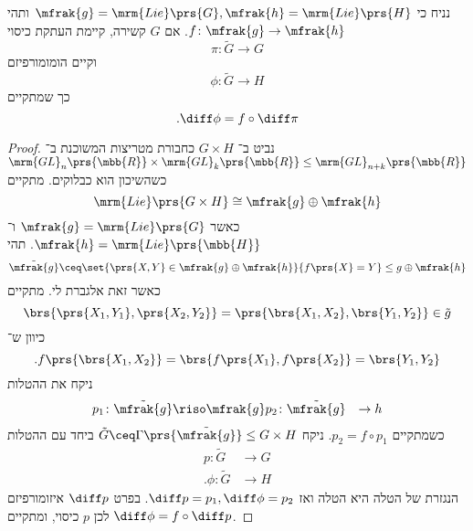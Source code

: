 \documentclass[10pt, twoside]{book}
\newcommand{\Lie}{\mrm{Lie}}
\begin{document}
\begin{theorem}
נניח כי
$\mfrak{g} = \Lie\prs{G}, \mfrak{h} = \Lie\prs{H}$
ותהי
$f \colon \mfrak{g} \to \mfrak{h}$.
אם
$G$
קשירה, קיימת העתקת כיסוי
\[\pi \colon \tilde{G} \to G\]
וקיים הומומורפיזם
\[\phi \colon \tilde{G} \to H\]
כך שמתקיים
\[\text{.} \diff \phi = f \circ \diff \pi\]
\end{theorem}

\begin{proof}
נביט ב־%
$G \times H$
כחבורת מטריצות המשוכנת ב־%
$\mrm{GL}_n\prs{\mbb{R}} \times \mrm{GL}_k\prs{\mbb{R}} \leq \mrm{GL}_{n+k}\prs{\mbb{R}}$
כשהשיכון הוא כבלוקים.
מתקיים
\[\Lie\prs{G \times H} \cong \mfrak{g} \oplus \mfrak{h}\]
כאשר
$\mfrak{g} = \Lie\prs{G}$
ו־%
$\mfrak{h} = \Lie\prs{\mbb{H}}$.
תהי
\[\tilde{\mfrak{g}} \ceq \set{\prs{X,Y} \in \mfrak{g} \oplus \mfrak{h}}{f\prs{X} = Y} \leq g \oplus \mfrak{h}\]
כאשר זאת אלגברת לי. מתקיים
\[\brs{\prs{X_1, Y_1}, \prs{X_2, Y_2}} = \prs{\brs{X_1, X_2}, \brs{Y_1, Y_2}} \in \tilde{g}\]
כיוון ש־%
\[\text{.} f\prs{\brs{X_1, X_2}} = \brs{f\prs{X_1}, f\prs{X_2}} = \brs{Y_1, Y_2}\]
ניקח את ההטלות
\begin{align*}
p_1 \colon \tilde{\mfrak{g}} &\riso \mfrak{g}
p_2 \colon \tilde{\mfrak{g}} &\to h
\end{align*}
כשמתקיים
$p_2 = f \circ p_1$.
ניקח
$\tilde{G} \ceq \Gamma\prs{\tilde{\mfrak{g}}} \leq G \times H$
ביחד עם ההטלות
\begin{align*}
p \colon \tilde{G} &\to G \\
\text{.} \phi \colon \tilde{G} &\to H
\end{align*}
הנגזרת של הטלה היא הטלה ואז
$\diff p = p_1, \diff \phi = p_2$.
בפרט
$\diff p$
איזומורפיזם לכן
$p$
כיסוי, ומתקיים
$\diff \phi = f \circ \diff p$.
\end{proof}
\end{document}
